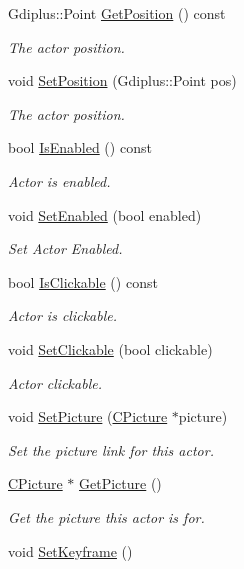 \begin{DoxyCompactItemize}
Gdiplus\+::\+Point \hyperlink{class_c_actor_ae3c531320a80c83419b4239c3227192b}{Get\+Position} () const 
\begin{DoxyCompactList}\small\item\em The actor position. \end{DoxyCompactList}\item 
void \hyperlink{class_c_actor_af0bda8fd0ba0320f9fd6e67b7b16a07d}{Set\+Position} (Gdiplus\+::\+Point pos)
\begin{DoxyCompactList}\small\item\em The actor position. \end{DoxyCompactList}\item 
bool \hyperlink{class_c_actor_ab3e78932aeb9e2a764670bc82ac85094}{Is\+Enabled} () const 
\begin{DoxyCompactList}\small\item\em Actor is enabled. \end{DoxyCompactList}\item 
void \hyperlink{class_c_actor_a6f9009e9753b07a00266cac01af2fdad}{Set\+Enabled} (bool enabled)
\begin{DoxyCompactList}\small\item\em Set Actor Enabled. \end{DoxyCompactList}\item 
bool \hyperlink{class_c_actor_a2a5738cceea3dc667611ba4c4d9a5db4}{Is\+Clickable} () const 
\begin{DoxyCompactList}\small\item\em Actor is clickable. \end{DoxyCompactList}\item 
void \hyperlink{class_c_actor_a6c717ba1037b3055a5ec94e18e1707de}{Set\+Clickable} (bool clickable)
\begin{DoxyCompactList}\small\item\em Actor clickable. \end{DoxyCompactList}\item 
void \hyperlink{class_c_actor_ac4b2315b3476d4fdc97ba961fdcaa444}{Set\+Picture} (\hyperlink{class_c_picture}{C\+Picture} $\ast$picture)
\begin{DoxyCompactList}\small\item\em Set the picture link for this actor. \end{DoxyCompactList}\item 
\hyperlink{class_c_picture}{C\+Picture} $\ast$ \hyperlink{class_c_actor_af94c21dd8535aaa4992904cdbec27b84}{Get\+Picture} ()
\begin{DoxyCompactList}\small\item\em Get the picture this actor is for. \end{DoxyCompactList}\item 
\hypertarget{class_c_actor_afb1fa3fe64e5ef64b54e84043fc2fa84}{void \hyperlink{class_c_actor_afb1fa3fe64e5ef64b54e84043fc2fa84}{Set\+Keyframe} ()}\label{class_c_actor_afb1fa3fe64e5ef64b54e84043fc2fa84}


\end{DoxyCompactItemize}
